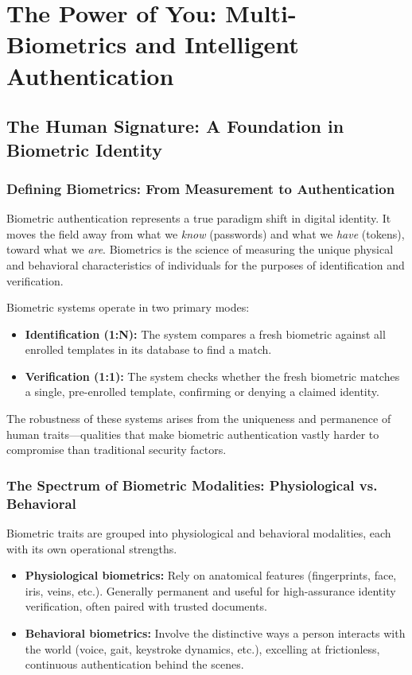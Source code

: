 \chapter{The Power of You: Multi-Biometrics and Intelligent Authentication}

\section{The Human Signature: A Foundation in Biometric Identity}

\subsection{Defining Biometrics: From Measurement to Authentication}
Biometric authentication represents a true paradigm shift in digital identity. It moves the field away from what we \emph{know} (passwords) and what we \emph{have} (tokens), toward what we \emph{are}. Biometrics is the science of measuring the unique physical and behavioral characteristics of individuals for the purposes of identification and verification.

Biometric systems operate in two primary modes:
\begin{itemize}
    \item \textbf{Identification (1:N):} The system compares a fresh biometric against all enrolled templates in its database to find a match.
    \item \textbf{Verification (1:1):} The system checks whether the fresh biometric matches a single, pre-enrolled template, confirming or denying a claimed identity.
\end{itemize}

The robustness of these systems arises from the uniqueness and permanence of human traits—qualities that make biometric authentication vastly harder to compromise than traditional security factors.

\subsection{The Spectrum of Biometric Modalities: Physiological vs. Behavioral}
Biometric traits are grouped into physiological and behavioral modalities, each with its own operational strengths.

\begin{itemize}
    \item \textbf{Physiological biometrics:} Rely on anatomical features (fingerprints, face, iris, veins, etc.). Generally permanent and useful for high-assurance identity verification, often paired with trusted documents.
    \item \textbf{Behavioral biometrics:} Involve the distinctive ways a person interacts with the world (voice, gait, keystroke dynamics, etc.), excelling at frictionless, continuous authentication behind the scenes.
\end{itemize}

